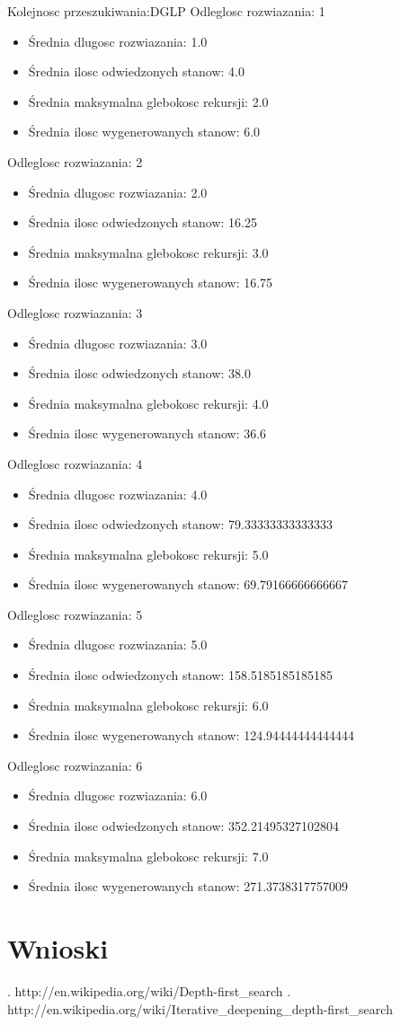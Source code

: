 \documentclass{classrep}
\begin{document}
		Kolejnosc przeszukiwania:DGLP
		Odleglosc rozwiazania: 1
		\begin{itemize}
			\item Średnia dlugosc rozwiazania: 1.0
			\item Średnia ilosc odwiedzonych stanow: 4.0
			\item Średnia maksymalna glebokosc rekursji: 2.0
			\item Średnia ilosc wygenerowanych stanow: 6.0
		\end{itemize}
		Odleglosc rozwiazania: 2
		\begin{itemize}
			\item Średnia dlugosc rozwiazania: 2.0
			\item Średnia ilosc odwiedzonych stanow: 16.25
			\item Średnia maksymalna glebokosc rekursji: 3.0
			\item Średnia ilosc wygenerowanych stanow: 16.75
		\end{itemize}
		Odleglosc rozwiazania: 3
		\begin{itemize}
			\item Średnia dlugosc rozwiazania: 3.0
			\item Średnia ilosc odwiedzonych stanow: 38.0
			\item Średnia maksymalna glebokosc rekursji: 4.0
			\item Średnia ilosc wygenerowanych stanow: 36.6
		\end{itemize}
		Odleglosc rozwiazania: 4
		\begin{itemize}
			\item Średnia dlugosc rozwiazania: 4.0
			\item Średnia ilosc odwiedzonych stanow: 79.33333333333333
			\item Średnia maksymalna glebokosc rekursji: 5.0
			\item Średnia ilosc wygenerowanych stanow: 69.79166666666667
		\end{itemize}
		Odleglosc rozwiazania: 5
		\begin{itemize}
			\item Średnia dlugosc rozwiazania: 5.0
			\item Średnia ilosc odwiedzonych stanow: 158.5185185185185
			\item Średnia maksymalna glebokosc rekursji: 6.0
			\item Średnia ilosc wygenerowanych stanow: 124.94444444444444
		\end{itemize}
		Odleglosc rozwiazania: 6
		\begin{itemize}
			\item Średnia dlugosc rozwiazania: 6.0
			\item Średnia ilosc odwiedzonych stanow: 352.21495327102804
			\item Średnia maksymalna glebokosc rekursji: 7.0
			\item Średnia ilosc wygenerowanych stanow: 271.3738317757009
		\end{itemize}
		
	\section{Wnioski}
	
	
	
	\begin{thebibliography}{0}
	  \bibitem. http://en.wikipedia.org/wiki/Depth-first\_search
	  \bibitem. http://en.wikipedia.org/wiki/Iterative\_deepening\_depth-first\_search   
	\end{thebibliography}
\end{document}
